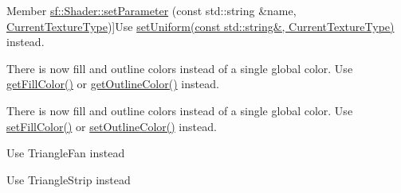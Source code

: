 \begin{DoxyRefList}
%
Member \hyperlink{classsf_1_1_shader_a0fa7ecad14206e4d5edae1d6aa87f553}{sf\+:\+:Shader\+:\+:set\+Parameter} (const std\+::string \&name, \hyperlink{structsf_1_1_shader_1_1_current_texture_type}{Current\+Texture\+Type})]Use \hyperlink{classsf_1_1_shader_ab18f531e1f726b88fec1cf5a1e6af26d}{set\+Uniform(const std\+::string\&, Current\+Texture\+Type)} instead. 
\item[\label{deprecated__deprecated000016}%
\Hypertarget{deprecated__deprecated000016}%
Member \hyperlink{classsf_1_1_text_a77ba664285efd72ab4ce85b9cbbeeb21}{sf\+:\+:Text\+:\+:get\+Color} () const]There is now fill and outline colors instead of a single global color. Use \hyperlink{classsf_1_1_text_a6b4ba8c435b59e1e05f831e6230dc537}{get\+Fill\+Color()} or \hyperlink{classsf_1_1_text_a53559d563461089f1172571b375442dc}{get\+Outline\+Color()} instead. 
\item[\label{deprecated__deprecated000015}%
\Hypertarget{deprecated__deprecated000015}%
Member \hyperlink{classsf_1_1_text_a6ce65272d6d63ed01118366e92c68132}{sf\+:\+:Text\+:\+:set\+Color} (const \hyperlink{classsf_1_1_color}{Color} \&color)]There is now fill and outline colors instead of a single global color. Use \hyperlink{classsf_1_1_text_ab7bb3babac5a6da1802b2c3e1a3e6dcc}{set\+Fill\+Color()} or \hyperlink{classsf_1_1_text_aa19ec69c3b894e963602a6804ca68fe4}{set\+Outline\+Color()} instead. 
\item[\label{deprecated__deprecated000003}%
\Hypertarget{deprecated__deprecated000003}%
Member \hyperlink{group__graphics_gga5ee56ac1339984909610713096283b1ba5338a2c6d922151fe50f235036af8a20}{sf\+:\+:Triangles\+Fan} ]Use Triangle\+Fan instead  
\item[\label{deprecated__deprecated000002}%
\Hypertarget{deprecated__deprecated000002}%
Member \hyperlink{group__graphics_gga5ee56ac1339984909610713096283b1ba66643dbbb24bbacb405973ed80eebae0}{sf\+:\+:Triangles\+Strip} ]Use Triangle\+Strip instead 
\end{DoxyRefList}